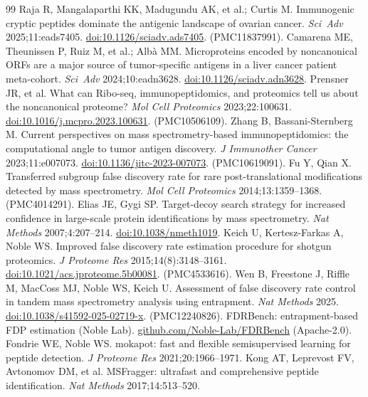 \begin{thebibliography}{99}\small
{} Raja R, Mangalaparthi KK, Madugundu AK, et al.; Curtis M. Immunogenic cryptic peptides dominate the antigenic landscape of ovarian cancer. \emph{Sci~Adv} 2025;11:eads7405. \href{https://doi.org/10.1126/sciadv.ads7405}{doi:10.1126/sciadv.ads7405}. (PMC11837991).
 Camarena ME, Theunissen P, Ruiz M, et al.; Alb\`a MM. Microproteins encoded by noncanonical ORFs are a major source of tumor-specific antigens in a liver cancer patient meta-cohort. \emph{Sci~Adv} 2024;10:eadn3628. \href{https://doi.org/10.1126/sciadv.adn3628}{doi:10.1126/sciadv.adn3628}.
 Prensner JR, et al. What can Ribo-seq, immunopeptidomics, and proteomics tell us about the noncanonical proteome? \emph{Mol Cell Proteomics} 2023;22:100631. \href{https://doi.org/10.1016/j.mcpro.2023.100631}{doi:10.1016/j.mcpro.2023.100631}. (PMC10506109).
 Zhang B, Bassani-Sternberg M. Current perspectives on mass spectrometry-based immunopeptidomics: the computational angle to tumor antigen discovery. \emph{J Immunother Cancer} 2023;11:e007073. \href{https://doi.org/10.1136/jitc-2023-007073}{doi:10.1136/jitc-2023-007073}. (PMC10619091).
 Fu Y, Qian X. Transferred subgroup false discovery rate for rare post-translational modifications detected by mass spectrometry. \emph{Mol Cell Proteomics} 2014;13:1359--1368. (PMC4014291).
 Elias JE, Gygi SP. Target-decoy search strategy for increased confidence in large-scale protein identifications by mass spectrometry. \emph{Nat Methods} 2007;4:207--214. \href{https://doi.org/10.1038/nmeth1019}{doi:10.1038/nmeth1019}.
 Keich U, Kertesz-Farkas A, Noble WS. Improved false discovery rate estimation procedure for shotgun proteomics. \emph{J Proteome Res} 2015;14(8):3148--3161. \href{https://doi.org/10.1021/acs.jproteome.5b00081}{doi:10.1021/acs.jproteome.5b00081}. (PMC4533616).
 Wen B, Freestone J, Riffle M, MacCoss MJ, Noble WS, Keich U. Assessment of false discovery rate control in tandem mass spectrometry analysis using entrapment. \emph{Nat Methods} 2025. \href{https://doi.org/10.1038/s41592-025-02719-x}{doi:10.1038/s41592-025-02719-x}. (PMC12240826).
 FDRBench: entrapment-based FDP estimation (Noble Lab). \href{https://github.com/Noble-Lab/FDRBench}{github.com/\allowbreak Noble-Lab/\allowbreak FDRBench} (Apache-2.0).
 Fondrie WE, Noble WS. mokapot: fast and flexible semisupervised learning for peptide detection. \emph{J Proteome Res} 2021;20:1966--1971.
 Kong AT, Leprevost FV, Avtonomov DM, et al. MSFragger: ultrafast and comprehensive peptide identification. \emph{Nat Methods} 2017;14:513--520.

\end{thebibliography}
